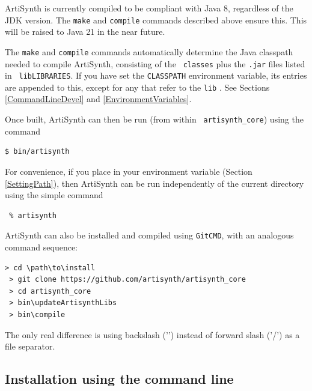 \begin{sideblock}
ArtiSynth is currently compiled to be compliant with Java 8, regardless
of the JDK version. The {\tt make} and {\tt compile} commands described
above ensure this. This will be raised to Java 21 in the near future.
\end{sideblock}

\begin{sideblock}
The {\tt make} and {\tt compile} commands automatically determine the
Java classpath needed to compile ArtiSynth, consisting of the {\tt
classes} \directory{} plus the {\tt .jar} files listed in {\tt
lib\SEP LIBRARIES}. If you have set the {\tt CLASSPATH} environment
variable, its entries are appended to this, except for any that refer
to the {\tt lib} \directory{}. See Sections \ref{CommandLineDevel}
and \ref{EnvironmentVariables}.
\end{sideblock}

Once built, ArtiSynth can then be run (from within {\tt
artisynth\_core}) using the command
%
\begin{lstlisting}[]
  $ bin/artisynth
\end{lstlisting}
%
\begin{sideblock}
For convenience, if you place  in your \PATH{}
environment variable (Section \ref{SettingPath}), 
then ArtiSynth can be run independently of the current
directory using the simple command
\begin{verbatim}
 % artisynth
\end{verbatim}
\end{sideblock}

ArtiSynth can also be installed and compiled using {\tt GitCMD},
with an analogous command sequence:
%
\begin{lstlisting}[]
 > cd \path\to\install
 > git clone https://github.com/artisynth/artisynth_core
 > cd artisynth_core
 > bin\updateArtisynthLibs
 > bin\compile
\end{lstlisting}
%
The only real difference is using backslash ('\BKS ') instead of
forward slash ('/') as a file separator.
\else %
\subsection{Installation using the command line}

